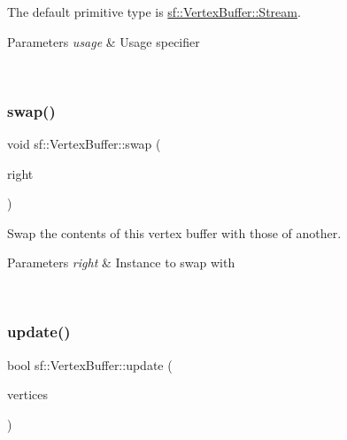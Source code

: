 The default primitive type is \mbox{\hyperlink{classsf_1_1_vertex_buffer_a3a531528684e63ecb45edd51282f5cb7aeed06a391698772af58a9cfdff77deaf}{sf\+::\+Vertex\+Buffer\+::\+Stream}}.


\begin{DoxyParams}{Parameters}
{\em usage} & Usage specifier \begin{DoxyVerb}\end{DoxyVerb}
 \\
\hline
\end{DoxyParams}
\mbox{\label{classsf_1_1_vertex_buffer_a3954d696848dc4c921c15a6b4459c8e6}} 
\subsubsection{\texorpdfstring{swap()}{swap()}}
{\footnotesize\ttfamily void sf\+::\+Vertex\+Buffer\+::swap (\begin{DoxyParamCaption}\item[{\mbox{\hyperlink{classsf_1_1_vertex_buffer}{Vertex\+Buffer}} \&}]{right }\end{DoxyParamCaption})}



Swap the contents of this vertex buffer with those of another. 


\begin{DoxyParams}{Parameters}
{\em right} & Instance to swap with \begin{DoxyVerb}\end{DoxyVerb}
 \\
\hline
\end{DoxyParams}
\mbox{\label{classsf_1_1_vertex_buffer_ad100a5f578a91c49a9009e3c6956c82d}} 
\subsubsection{\texorpdfstring{update()}{update()}\hspace{0.1cm}{\footnotesize\ttfamily [1/3]}}
{\footnotesize\ttfamily bool sf\+::\+Vertex\+Buffer\+::update (\begin{DoxyParamCaption}\item[{const \mbox{\hyperlink{classsf_1_1_vertex}{Vertex}} $\ast$}]{vertices }\end{DoxyParamCaption})}



